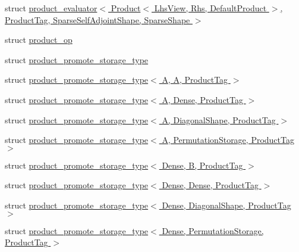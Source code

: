 \begin{DoxyCompactItemize}
\item 
struct \hyperlink{struct_eigen_1_1internal_1_1product__evaluator_3_01_product_3_01_lhs_view_00_01_rhs_00_01_defaul9695c5493cd4054bc6e3c91568225f16}{product\+\_\+evaluator$<$ Product$<$ Lhs\+View, Rhs, Default\+Product $>$, Product\+Tag, Sparse\+Self\+Adjoint\+Shape, Sparse\+Shape $>$}
\item 
struct \hyperlink{struct_eigen_1_1internal_1_1product__op}{product\+\_\+op}
\item 
struct \hyperlink{struct_eigen_1_1internal_1_1product__promote__storage__type}{product\+\_\+promote\+\_\+storage\+\_\+type}
\item 
struct \hyperlink{struct_eigen_1_1internal_1_1product__promote__storage__type_3_01_a_00_01_a_00_01_product_tag_01_4}{product\+\_\+promote\+\_\+storage\+\_\+type$<$ A, A, Product\+Tag $>$}
\item 
struct \hyperlink{struct_eigen_1_1internal_1_1product__promote__storage__type_3_01_a_00_01_dense_00_01_product_tag_01_4}{product\+\_\+promote\+\_\+storage\+\_\+type$<$ A, Dense, Product\+Tag $>$}
\item 
struct \hyperlink{struct_eigen_1_1internal_1_1product__promote__storage__type_3_01_a_00_01_diagonal_shape_00_01_product_tag_01_4}{product\+\_\+promote\+\_\+storage\+\_\+type$<$ A, Diagonal\+Shape, Product\+Tag $>$}
\item 
struct \hyperlink{struct_eigen_1_1internal_1_1product__promote__storage__type_3_01_a_00_01_permutation_storage_00_01_product_tag_01_4}{product\+\_\+promote\+\_\+storage\+\_\+type$<$ A, Permutation\+Storage, Product\+Tag $>$}
\item 
struct \hyperlink{struct_eigen_1_1internal_1_1product__promote__storage__type_3_01_dense_00_01_b_00_01_product_tag_01_4}{product\+\_\+promote\+\_\+storage\+\_\+type$<$ Dense, B, Product\+Tag $>$}
\item 
struct \hyperlink{struct_eigen_1_1internal_1_1product__promote__storage__type_3_01_dense_00_01_dense_00_01_product_tag_01_4}{product\+\_\+promote\+\_\+storage\+\_\+type$<$ Dense, Dense, Product\+Tag $>$}
\item 
struct \hyperlink{struct_eigen_1_1internal_1_1product__promote__storage__type_3_01_dense_00_01_diagonal_shape_00_01_product_tag_01_4}{product\+\_\+promote\+\_\+storage\+\_\+type$<$ Dense, Diagonal\+Shape, Product\+Tag $>$}
\item 
struct \hyperlink{struct_eigen_1_1internal_1_1product__promote__storage__type_3_01_dense_00_01_permutation_storage_00_01_product_tag_01_4}{product\+\_\+promote\+\_\+storage\+\_\+type$<$ Dense, Permutation\+Storage, Product\+Tag $>$}

\end{DoxyCompactItemize}
